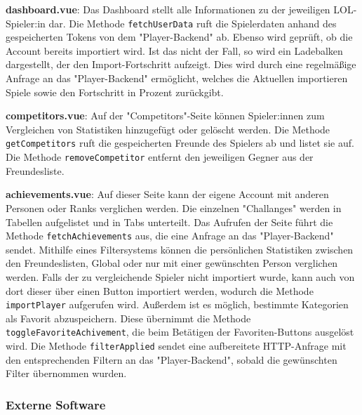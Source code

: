 \textbf{dashboard.vue}: Das Dashboard stellt alle Informationen zu der jeweiligen LOL-Spieler:in dar. Die Methode \verb|fetchUserData| ruft die Spielerdaten anhand des gespeicherten Tokens
von dem "Player-Backend" ab. Ebenso wird geprüft, ob die Account bereits importiert wird. Ist das nicht der Fall, so wird ein Ladebalken dargestellt, der den Import-Fortschritt aufzeigt. Dies
wird durch eine regelmäßige Anfrage an das "Player-Backend" ermöglicht, welches die Aktuellen importieren Spiele sowie den Fortschritt in Prozent zurückgibt.
\newline

\textbf{competitors.vue}: Auf der "Competitors"-Seite können Spieler:innen zum Vergleichen von Statistiken hinzugefügt oder gelöscht werden. Die Methode \verb|getCompetitors| ruft die gespeicherten
Freunde des Spielers ab und listet sie auf. Die Methode \verb|removeCompetitor| entfernt den jeweiligen Gegner aus der Freundesliste.
\newline

\textbf{achievements.vue}: Auf dieser Seite kann der eigene Account mit anderen Personen oder Ranks verglichen werden. Die einzelnen "Challanges" werden in Tabellen aufgelistet und in Tabs unterteilt.
Das Aufrufen der Seite führt die Methode \verb|fetchAchievements| aus, die eine Anfrage an das "Player-Backend" sendet. Mithilfe eines Filtersystems können die persönlichen
Statistiken zwischen den Freundeslisten, Global oder nur mit einer gewünschten Person verglichen werden. Falls der zu vergleichende Spieler nicht importiert wurde, kann auch von dort dieser über einen 
Button importiert werden, wodurch die Methode \verb|importPlayer| aufgerufen wird. Außerdem ist es möglich, bestimmte Kategorien als Favorit abzuspeichern. Diese übernimmt die Methode
\verb|toggleFavoriteAchivement|, die beim Betätigen der Favoriten-Buttons ausgelöst wird. Die Methode \verb|filterApplied| sendet eine aufbereitete HTTP-Anfrage mit den entsprechenden Filtern
an das "Player-Backend", sobald die gewünschten Filter übernommen wurden.
\newline

\subsubsection{Externe Software}